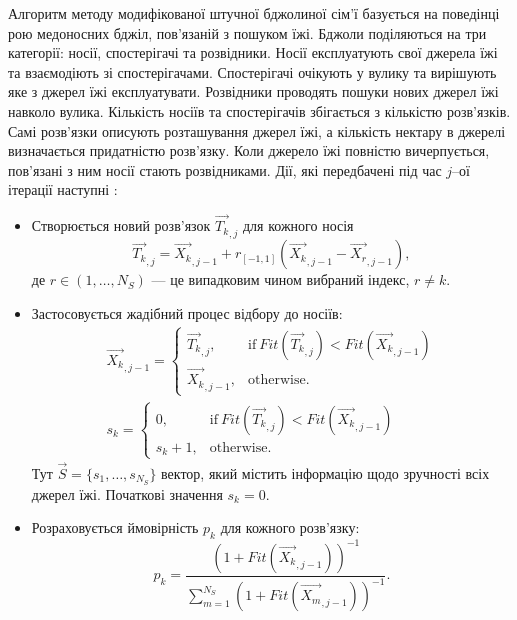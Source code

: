 Алгоритм методу модифікованої штучної бджолиної сім'ї базується на поведінці рою медоносних бджіл, пов'язаній з пошуком їжі.
Бджоли поділяються на три категорії: носії, спостерігачі та розвідники.
Носії експлуатують свої джерела їжі та взаємодіють зі спостерігачами.
Спостерігачі очікують у вулику та вирішують яке з джерел їжі експлуатувати.
Розвідники проводять пошуки нових джерел їжі навколо вулика.
Кількість носіїв та спостерігачів збігається з кількістю розв'язків.
Самі розв'язки описують розташування джерел їжі, а кількість нектару в джерелі визначається придатністю розв'язку.
Коли джерело їжі повністю вичерпується, пов'язані з ним носії стають розвідниками.
Дії, які передбачені під час $j$--ої ітерації наступні \cite{MABC}:
\begin{itemize}[leftmargin=0cm,itemindent=1em]
  \item Створюється новий розв'язок $\overrightarrow{T_{k}}_{,j}$ для кожного носія
 \begin{equation}
 \label{eqMABCNew}
 \overrightarrow{T_{k}}_{,j}=\overrightarrow{X_{k}}_{,j-1}+r_{[-1,1]}(\overrightarrow{X_{k}}_{,j-1}-\overrightarrow{X_{r}}_{,j-1}),
 \end{equation}
 де
 $r\in(1,\ldots,N_S)$ --- це випадковим чином вибраний індекс, $r\neq k$.
  \item Застосовується жадібний процес відбору до носіїв:
 \begin{eqnarray}
 \label{eqMABC_GS1}
 \overrightarrow{X_{k}}_{,j-1}=\left\{
 \begin{array}{ll}
\overrightarrow{T_{k}}_{,j},& \text{if} \: Fit(\overrightarrow{T_k}_{,j})<Fit(\overrightarrow{X_k}_{,j-1})\\
 \overrightarrow{X_{k}}_{,j-1},& \text{otherwise}.
 \end{array}
 \right.
 \\
 \label{eqMABC_GS2}
 s_k=\left\{
 \begin{array}{ll}
0,& \text{if} \: Fit(\overrightarrow{T_k}_{,j})<Fit(\overrightarrow{X_k}_{,j-1})\\
s_k+1 ,& \text{otherwise}.
 \end{array}
 \right.
 \end{eqnarray}
 Тут $\overrightarrow{S}=\{s_1,\ldots,s_{N_S}\}$ вектор, який містить інформацію щодо зручності всіх джерел їжі.
 Початкові значення $s_k=0$.

 \item Розраховується ймовірність $p_k$ для кожного розв'язку:
 \begin{equation}
 \label{eqMABCP}
 p_k=\frac{(1+ Fit(\overrightarrow{X_k}_{,j-1}))^{-1}}{\sum_{m=1}^{N_S}(1+ Fit(\overrightarrow{X_m}_{,j-1}))^{-1}}.
  \end{equation}


\end{itemize}
